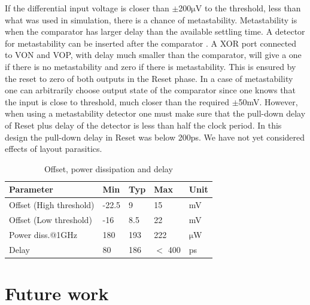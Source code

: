 If the differential input voltage is closer than
\begin{math}\pm{}\end{math}200\begin{math}\mathrm{\mu}\end{math}V to
the threshold, less than what was used in simulation, there is a chance
of metastability. Metastability is when the comparator has larger delay
than the available settling time. A detector for metastability can be
inserted after the comparator \cite{kinniment99}. A XOR port connected to VON and VOP, with delay much smaller than
the comparator, will give a one if there is no metastability and zero
if there is metastability. This is ensured by the reset to zero of both
outputs in the Reset phase. In a case of metastability one can
arbitrarily choose output state of the comparator since one knows that
the input is close to threshold, much closer than the required
\begin{math}\pm{}\end{math}50mV. However, when using a metastability
detector one must make sure that the pull-down delay of Reset plus
delay of the detector is less than half the clock period. In this
design the pull-down delay in Reset was below 200ps. We have not yet
considered effects of layout parasitics.
 

\begin{table}[htbp]
\centering
\renewcommand{\arraystretch}{1.3}
\caption{ Offset, power dissipation and delay}
\label{p1tab:p1_offset}
\begin{tabular}{l|l|l|l|l}
\textbf{Parameter}
&
\textbf{Min}
&
\textbf{Typ}
&
\textbf{Max}
&
\textbf{Unit}\\
\hline

Offset (High threshold)
&
-22.5
&
9
&
15
&
mV
 \\
\hline
Offset (Low threshold)
&
-16
&
8.5
&
22
&
mV
 \\
\hline
Power diss.@1GHz
&
180
&
193
&
222
&
\begin{math}\mathrm{\mu}\end{math}W
 \\
\hline
Delay
&
80
&
186
&
\begin{math}<\end{math} 400
&
ps
 \\
\hline
\end{tabular}
 
\end{table}

\section{Future work}

